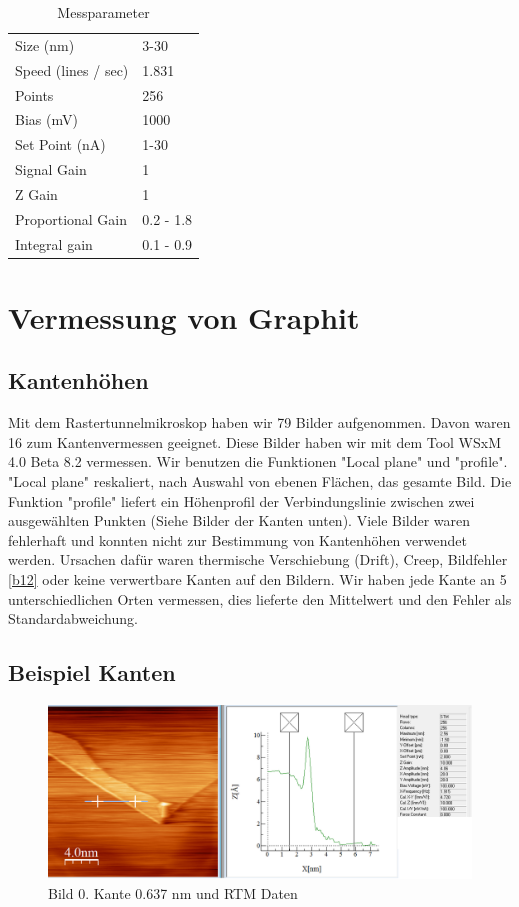 \documentclass[10pt,a4paper]{article}
\begin{document}
	\begin{table}[]
		\centering
		\caption{Messparameter}
		\label{Messparameter}
		\begin{tabular}{ll}
			Size (nm)           & 3-30      \\
			Speed (lines / sec) & 1.831     \\
			Points              & 256       \\
			Bias (mV)           & 1000      \\
			Set Point (nA)      & 1-30      \\
			Signal Gain         & 1         \\
			Z Gain              & 1         \\
			Proportional Gain   & 0.2 - 1.8 \\
			Integral gain       & 0.1 - 0.9
		\end{tabular}
	\end{table}

\section{Vermessung von Graphit }

\subsection{ Kantenhöhen}

Mit dem Rastertunnelmikroskop haben wir 79 Bilder aufgenommen. Davon waren 16 zum Kantenvermessen geeignet.
Diese Bilder haben wir mit dem Tool WSxM 4.0 Beta 8.2 vermessen. 
Wir benutzen die Funktionen "Local plane" und "profile". "Local plane" reskaliert, nach Auswahl von ebenen Flächen, das gesamte Bild.  Die Funktion "profile" liefert ein Höhenprofil der Verbindungslinie zwischen zwei ausgewählten Punkten (Siehe Bilder der Kanten unten).
Viele Bilder waren fehlerhaft und konnten nicht zur Bestimmung von Kantenhöhen verwendet werden.
Ursachen dafür waren thermische Verschiebung (Drift), Creep, Bildfehler \ref{b12} oder keine verwertbare Kanten auf den Bildern. Wir haben jede Kante an 5 unterschiedlichen Orten vermessen, dies lieferte den Mittelwert und den Fehler als Standardabweichung.



\subsection{Beispiel Kanten}

\begin{figure}[]
	\includegraphics[scale = 0.3]{bild00.png}
	\centering
	\caption{Bild 0. Kante 0.637 nm und RTM Daten}
	\label{b0}
\end{figure}
\end{document}
